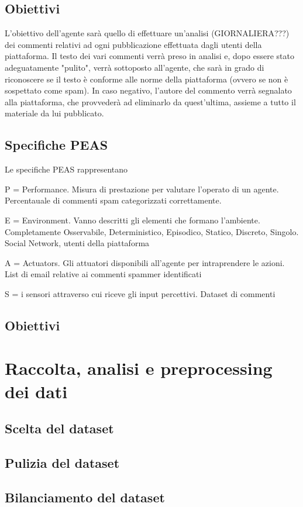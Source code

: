 \documentclass{article} %
\begin{document}
    \subsection{Obiettivi}
    L'obiettivo dell'agente sarà quello di effettuare un'analisi (GIORNALIERA???) dei commenti relativi ad ogni pubblicazione effettuata dagli utenti della piattaforma.
    Il testo dei vari commenti verrà preso in analisi e, dopo essere stato adeguatamente "pulito", verrà sottoposto all'agente, che sarà in grado di riconoscere se il 
    testo è conforme alle norme della piattaforma (ovvero se non è sospettato come spam). \newline
    In caso negativo, l'autore del commento verrà segnalato alla piattaforma, che provvederà ad eliminarlo da quest'ultima, assieme a tutto il materiale da lui pubblicato.

    \subsection{Specifiche PEAS}
    Le specifiche PEAS rappresentano

P = Performance. Misura di prestazione per valutare l'operato di un agente.
Percentauale di commenti spam categorizzati correttamente.

E = Environment. Vanno descritti gli elementi che formano l'ambiente.
Completamente Osservabile, Deterministico, Episodico, Statico, Discreto, Singolo.
Social Network, utenti della piattaforma

A = Actuators. Gli attuatori disponibili all'agente per intraprendere le azioni.
List di email relative ai commenti spammer identificati                    

S = i sensori attraverso cui riceve gli input percettivi.
Dataset di commenti

    \subsection{Obiettivi}
    \section{Raccolta, analisi e preprocessing dei dati}
    \subsection{Scelta del dataset}
    \subsection{Pulizia del dataset}
    \subsection{Bilanciamento del dataset}
\end{document}
